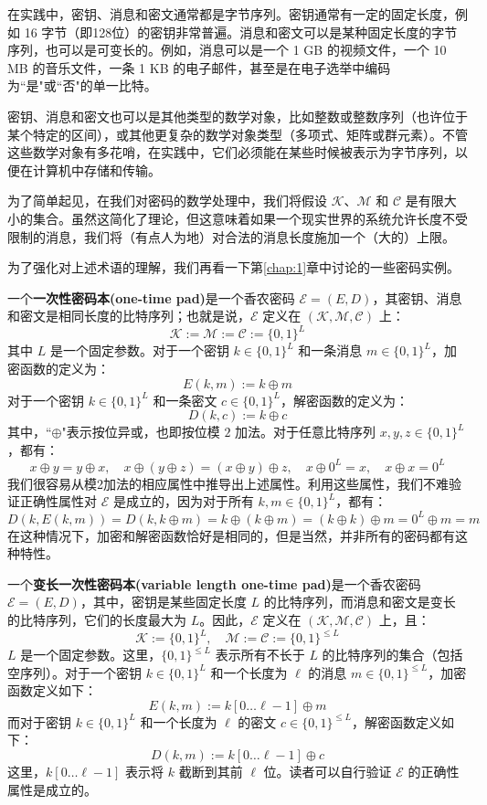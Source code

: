 在实践中，密钥、消息和密文通常都是字节序列。密钥通常有一定的固定长度，例如 16 字节（即128位）的密钥非常普遍。消息和密文可以是某种固定长度的字节序列，也可以是可变长的。例如，消息可以是一个 1 GB 的视频文件，一个 10 MB 的音乐文件，一条 1 KB 的电子邮件，甚至是在电子选举中编码为``是"或``否"的单一比特。

密钥、消息和密文也可以是其他类型的数学对象，比如整数或整数序列（也许位于某个特定的区间），或其他更复杂的数学对象类型（多项式、矩阵或群元素）。不管这些数学对象有多花哨，在实践中，它们必须能在某些时候被表示为字节序列，以便在计算机中存储和传输。

为了简单起见，在我们对密码的数学处理中，我们将假设 $\mathcal{K}$、$\mathcal{M}$ 和 $\mathcal{C}$ 是有限大小的集合。虽然这简化了理论，但这意味着如果一个现实世界的系统允许长度不受限制的消息，我们将（有点人为地）对合法的消息长度施加一个（大的）上限。

为了强化对上述术语的理解，我们再看一下第\ref{chap:1}章中讨论的一些密码实例。

\begin{example}\label{exmp:2-1}
一个\textbf{一次性密码本(one-time pad)}是一个香农密码 $\mathcal{E}=(E,D)$，其密钥、消息和密文是相同长度的比特序列；也就是说，$\mathcal{E}$ 定义在 $(\mathcal{K},\mathcal{M},\mathcal{C})$ 上：
\[
\mathcal{K}:=\mathcal{M}:=\mathcal{C}:=\{0,1\}^L
\]
其中 $L$ 是一个固定参数。对于一个密钥 $k\in\{0,1\}^L$ 和一条消息 $m\in\{0,1\}^L$，加密函数的定义为：
\[
E(k,m):=k\oplus m
\]
对于一个密钥 $k\in\{0,1\}^L$ 和一条密文 $c\in\{0,1\}^L$，解密函数的定义为：
\[
D(k,c):=k\oplus c
\]
其中，``$\oplus$"表示按位异或，也即按位模 $2$ 加法。对于任意比特序列 $x,y,z\in\{0,1\}^L$，都有：
\[
x\oplus y=y\oplus x,
\quad
x\oplus (y\oplus z)=(x\oplus y)\oplus z,
\quad
x\oplus 0^L =x,
\quad
x\oplus x =0^L
\]
我们很容易从模2加法的相应属性中推导出上述属性。利用这些属性，我们不难验证正确性属性对 $\mathcal{E}$ 是成立的，因为对于所有 $k,m\in\{0,1\}^L$，都有：
\[
D(k,E(k,m))=D(k,k\oplus m)=k\oplus (k\oplus m)=(k\oplus k)\oplus m=0^L\oplus m=m
\]
在这种情况下，加密和解密函数恰好是相同的，但是当然，并非所有的密码都有这种特性。
\end{example}

\begin{example}\label{exmp:2-2}
一个\textbf{变长一次性密码本(variable length one-time pad)}是一个香农密码 $\mathcal{E}=(E,D)$，其中，密钥是某些固定长度 $L$ 的比特序列，而消息和密文是变长的比特序列，它们的长度最大为 $L$。因此，$\mathcal{E}$ 定义在 $(\mathcal{K},\mathcal{M},\mathcal{C})$ 上，且：
\[
\mathcal{K}:=\{0,1\}^L,
\quad
\mathcal{M}:=\mathcal{C}:=\{0,1\}^{\leq L}
\]
$L$ 是一个固定参数。这里，$\{0,1\}^{\leq L}$ 表示所有不长于 $L$ 的比特序列的集合（包括空序列）。对于一个密钥 $k\in\{0,1\}^L$ 和一个长度为 $\ell$ 的消息 $m\in\{0,1\}^{\leq L}$，加密函数定义如下：
\[
E(k,m):=k[0\dots\ell-1]\oplus m
\]
而对于密钥 $k\in\{0,1\}^L$ 和一个长度为 $\ell$ 的密文 $c\in\{0,1\}^{\leq L}$，解密函数定义如下：
\[
D(k,m):=k[0\dots\ell-1]\oplus c
\]
这里，$k[0\dots\ell-1]$ 表示将 $k$ 截断到其前 $\ell$ 位。读者可以自行验证 $\mathcal{E}$ 的正确性属性是成立的。
\end{example}

